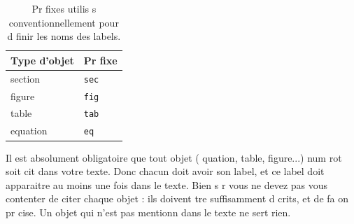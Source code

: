 \documentclass{article}
\begin{document}
\begin{table}[htb]
	\centering
	\begin{tabular}{l l}
		\hline
		\rowcolor{DarkColor} 
		\textbf{Type d'objet}	& \textbf{Pr fixe}	\\
		\hline
		section					& \texttt{sec}	\\
		figure 					& \texttt{fig}	\\
		table 					& \texttt{tab}	\\
		equation 				& \texttt{eq}	\\
		\hline
	\end{tabular}
	\caption{Pr fixes utilis s conventionnellement pour d finir les noms des labels.}
	\label{tab:prefixes}
\end{table}
	
Il est absolument obligatoire que tout objet ( quation, table, figure...) num rot  soit cit  dans votre texte. Donc chacun doit avoir son label, et ce label doit apparaitre au moins une fois dans le texte. Bien s r vous ne devez pas vous contenter de citer chaque objet : ils doivent  tre suffisamment d crits, et de fa on pr cise. Un objet qui n'est pas mentionn  dans le texte ne sert   rien.



\end{document}
